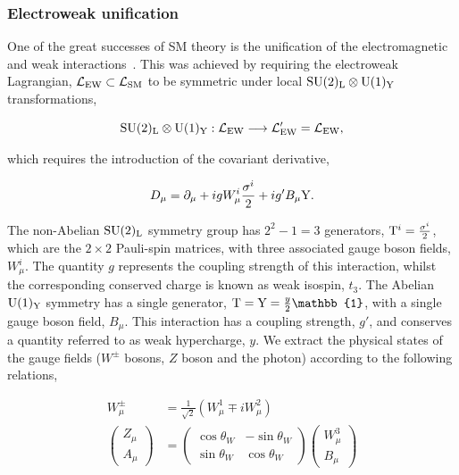 \subsubsection{Electroweak unification}
One of the great successes of SM theory is the unification of the electromagnetic and weak interactions~\cite{Glashow:1961tr,Weinberg:1967tq,Salam:1968rm}. This was achieved by requiring the electroweak Lagrangian, $\mathcal{L}_{\rm{EW}} \subset \mathcal{L}_{\rm{SM}}$ to be symmetric under local ${\rm{SU}(2)_{\rm{L}}}\otimes{\rm{U}}(1)_{\rm{Y}}$ transformations,

\begin{equation}
    {\rm{SU}}(2)_{\rm{L}}\otimes{\rm{U}}(1)_{\rm{Y}}: \mathcal{L}_{\rm{EW}} \longrightarrow \mathcal{L}'_{\rm{EW}} = \mathcal{L}_{\rm{EW}},
\end{equation}

\noindent
which requires the introduction of the covariant derivative,

\begin{equation}\label{eq:ew_covariant}
    D_\mu = \partial_\mu + i g W^i_\mu \frac{\sigma^i}{2} + i g' B_\mu {\rm{Y}}. %
\end{equation}

\noindent
The non-Abelian ${\rm{SU}}(2)_{\rm{L}}$ symmetry group has $2^2-1=3$ generators, ${\rm{T}}^i=\frac{\sigma^i}{2}$, which are the $2\times2$ Pauli-spin matrices, with three associated gauge boson fields, $W^i_\mu$. The quantity $g$ represents the coupling strength of this interaction, whilst the corresponding conserved charge is known as weak isospin, $t_3$. The Abelian ${\rm{U}}(1)_{\rm{Y}}$ symmetry has a single generator, ${\rm{T}}={\rm{Y}}=\frac{y}{2}\mathbb{1}$, with a single gauge boson field, $B_\mu$. This interaction has a coupling strength, $g'$, and conserves a quantity referred to as weak hypercharge, $y$. We extract the physical states of the gauge fields ($W^\pm$ bosons, $Z$ boson and the photon) according to the following relations,

\begin{equation}\label{eq:ew_rotation}
\begin{split}
    W^{\pm}_\mu &= \frac{1}{\sqrt{2}}(W_\mu^1 \mp iW_\mu^2) \\
    \begin{pmatrix}
    Z_\mu \\
    A_\mu
    \end{pmatrix} 
    &= 
    \begin{pmatrix}
    \cos{\theta_W} & -\sin{\theta_W} \\
    \sin{\theta_W} & \cos{\theta_W}
    \end{pmatrix} 
    \begin{pmatrix}
    W^3_\mu \\
    B_\mu
    \end{pmatrix}
\end{split}
\end{equation}

